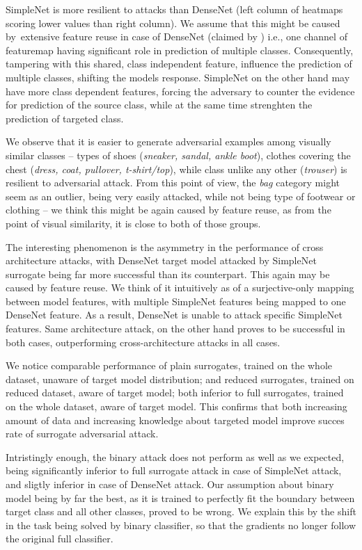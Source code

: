 SimpleNet is more resilient to attacks than DenseNet (left column of heatmaps scoring lower values than right column). We assume that this might be caused by~extensive feature reuse in case of DenseNet (claimed by \cite{DBLP:journals/corr/HuangLW16a}) i.e., one channel of featuremap having significant role in prediction of multiple classes. Consequently, tampering with this shared, class independent feature, influence the prediction of multiple classes, shifting the models response. SimpleNet on the other hand may have more class dependent features, forcing the adversary to counter the evidence for prediction of the source class, while at the same time strenghten the prediction of targeted class.

We observe that it is easier to generate adversarial examples among visually similar classes -- types of shoes (\emph{sneaker, sandal, ankle boot}), clothes covering the chest (\emph{dress, coat, pullover, t-shirt/top}), while class unlike any other (\emph{trouser}) is resilient to adversarial attack. From this point of view, the \textit{bag} category might seem as an outlier, being very easily attacked, while not being type of footwear or clothing -- we think this might be again caused by feature reuse, as from the point of visual similarity, it is close to both of those groups.

The interesting phenomenon is the asymmetry in the performance of cross architecture attacks, with DenseNet target model attacked by SimpleNet surrogate being far more successful than its counterpart. This again may be caused by feature reuse. We think of it intuitively as of a surjective-only mapping between model features, with multiple SimpleNet features being mapped to one DenseNet feature. As a result, DenseNet is unable to attack specific SimpleNet features. Same architecture attack, on the other hand proves to be successful in both cases, outperforming cross-architecture attacks in all cases.

We notice comparable performance of plain surrogates, trained on the whole dataset, unaware of target model distribution; and reduced surrogates, trained on reduced dataset, aware of target model; both inferior to full surrogates, trained on the whole dataset, aware of target model. This confirms that both increasing amount of data and increasing knowledge about targeted model improve succes rate of surrogate adversarial attack.

Intristingly enough, the binary attack does not perform as well as we expected, being significantly inferior to full surrogate attack in case of SimpleNet attack, and sligtly inferior in case of DenseNet attack. Our assumption about binary model being by far the best, as it is trained to perfectly fit the boundary between target class and all other classes, proved to be wrong. We explain this by the shift in the task being solved by binary classifier, so that the gradients no longer follow the original full classifier.

